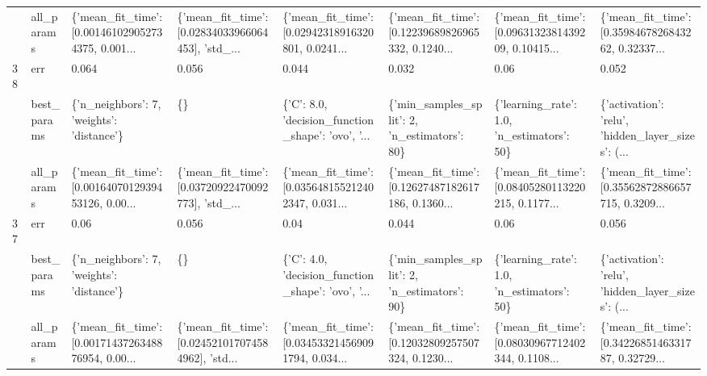 \begin{tabular}{llllllll}
   & all\_params &  \{'mean\_fit\_time': [0.001461029052734375, 0.001... &  \{'mean\_fit\_time': [0.02834033966064453], 'std\_... &  \{'mean\_fit\_time': [0.02942318916320801, 0.0241... &  \{'mean\_fit\_time': [0.12239689826965332, 0.1240... &  \{'mean\_fit\_time': [0.0963132381439209, 0.10415... &  \{'mean\_fit\_time': [0.3598467826843262, 0.32337... \\
38 & err &                                              0.064 &                                              0.056 &                                              0.044 &                                              0.032 &                                               0.06 &                                              0.052 \\
   & best\_params &          \{'n\_neighbors': 7, 'weights': 'distance'\} &                                                 \{\} &  \{'C': 8.0, 'decision\_function\_shape': 'ovo', '... &       \{'min\_samples\_split': 2, 'n\_estimators': 80\} &         \{'learning\_rate': 1.0, 'n\_estimators': 50\} &  \{'activation': 'relu', 'hidden\_layer\_sizes': (... \\
   & all\_params &  \{'mean\_fit\_time': [0.0016407012939453126, 0.00... &  \{'mean\_fit\_time': [0.03720922470092773], 'std\_... &  \{'mean\_fit\_time': [0.035648155212402347, 0.031... &  \{'mean\_fit\_time': [0.12627487182617186, 0.1360... &  \{'mean\_fit\_time': [0.08405280113220215, 0.1177... &  \{'mean\_fit\_time': [0.35562872886657715, 0.3209... \\
37 & err &                                               0.06 &                                              0.056 &                                               0.04 &                                              0.044 &                                               0.06 &                                              0.056 \\
   & best\_params &          \{'n\_neighbors': 7, 'weights': 'distance'\} &                                                 \{\} &  \{'C': 4.0, 'decision\_function\_shape': 'ovo', '... &       \{'min\_samples\_split': 2, 'n\_estimators': 90\} &         \{'learning\_rate': 1.0, 'n\_estimators': 50\} &  \{'activation': 'relu', 'hidden\_layer\_sizes': (... \\
   & all\_params &  \{'mean\_fit\_time': [0.0017143726348876954, 0.00... &  \{'mean\_fit\_time': [0.024521017074584962], 'std... &  \{'mean\_fit\_time': [0.034533214569091794, 0.034... &  \{'mean\_fit\_time': [0.12032809257507324, 0.1230... &  \{'mean\_fit\_time': [0.08030967712402344, 0.1108... &  \{'mean\_fit\_time': [0.3422685146331787, 0.32729... \\
\bottomrule
\end{tabular}
